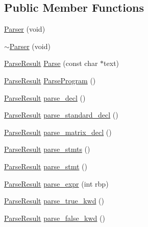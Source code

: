 \subsection*{Public Member Functions}
\begin{DoxyCompactItemize}
\item 
\hyperlink{classfcal_1_1parser_1_1Parser_ada2442b0be6b28f128f2f993bfeb02ff}{Parser} (void)
\item 
\hyperlink{classfcal_1_1parser_1_1Parser_aab2e272d7a2e630fa248a61aa3b22653}{$\sim$\+Parser} (void)
\item 
\hyperlink{classfcal_1_1parser_1_1ParseResult}{Parse\+Result} \hyperlink{classfcal_1_1parser_1_1Parser_a57428b932759f7a6d5d65ff6e83c3ed1}{Parse} (const char $\ast$text)
\item 
\hyperlink{classfcal_1_1parser_1_1ParseResult}{Parse\+Result} \hyperlink{classfcal_1_1parser_1_1Parser_a43de3cc3ab812c746520188acad91b3d}{Parse\+Program} ()
\item 
\hyperlink{classfcal_1_1parser_1_1ParseResult}{Parse\+Result} \hyperlink{classfcal_1_1parser_1_1Parser_a5f3775636ba12362f72e039561336557}{parse\+\_\+decl} ()
\item 
\hyperlink{classfcal_1_1parser_1_1ParseResult}{Parse\+Result} \hyperlink{classfcal_1_1parser_1_1Parser_aa62545007028e5272d9643c876a9822c}{parse\+\_\+standard\+\_\+decl} ()
\item 
\hyperlink{classfcal_1_1parser_1_1ParseResult}{Parse\+Result} \hyperlink{classfcal_1_1parser_1_1Parser_aa4fe3c8652e6b19863d561f7bd5d6184}{parse\+\_\+matrix\+\_\+decl} ()
\item 
\hyperlink{classfcal_1_1parser_1_1ParseResult}{Parse\+Result} \hyperlink{classfcal_1_1parser_1_1Parser_a4380df554ab7d5e34118f766270de432}{parse\+\_\+stmts} ()
\item 
\hyperlink{classfcal_1_1parser_1_1ParseResult}{Parse\+Result} \hyperlink{classfcal_1_1parser_1_1Parser_aa5a86ad0157bcd6f1c65a849ea5acafa}{parse\+\_\+stmt} ()
\item 
\hyperlink{classfcal_1_1parser_1_1ParseResult}{Parse\+Result} \hyperlink{classfcal_1_1parser_1_1Parser_ae3ef50b5c351bd8d899be70b00977246}{parse\+\_\+expr} (int rbp)
\item 
\hyperlink{classfcal_1_1parser_1_1ParseResult}{Parse\+Result} \hyperlink{classfcal_1_1parser_1_1Parser_a90f9e6e5bb7b0bb8f6165653081d9df3}{parse\+\_\+true\+\_\+kwd} ()
\item 
\hyperlink{classfcal_1_1parser_1_1ParseResult}{Parse\+Result} \hyperlink{classfcal_1_1parser_1_1Parser_a3118c7b669131067232a17de629549f6}{parse\+\_\+false\+\_\+kwd} ()

\end{DoxyCompactItemize}
